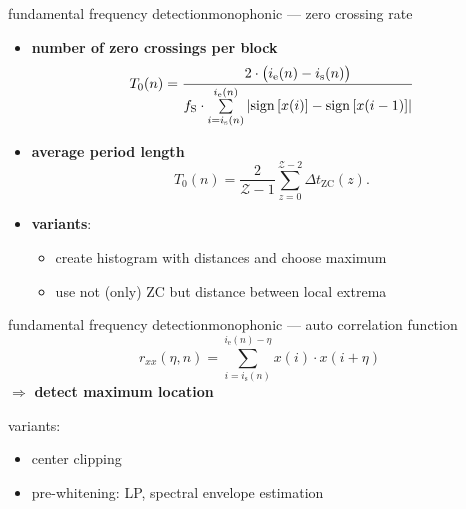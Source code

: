 	
	\begin{frame}{fundamental frequency detection}{monophonic --- zero crossing rate}
		\begin{itemize}
			\item	\textbf{number of zero crossings per block}
				\begin{equation*}
					T_0(n) = \frac{2\cdot \big(i_{\mathrm{e}}(n)-i_{\mathrm{s}}(n)\big)}{f_{\mathrm{S}}\cdot\sum\limits_{i=i_{\mathrm{s}}(n)}^{i_{\mathrm{e}}(n)}{\left|\operatorname*{sign} \left[x(i)\right]-\operatorname*{sign} \left[x(i-1)\right]\right|}} 
				\end{equation*}
			\pause
			\item	\textbf{average period length}
				\begin{equation*}
					T_0(n) = \frac{2}{\mathcal{Z}-1}\sum\limits_{z=0}^{\mathcal{Z}-2}{\Delta t_\mathrm{ZC}(z)}.
				\end{equation*}
			\pause
			\item	\textbf{variants}:
				\pause
				\begin{itemize}
					\item	create histogram with distances and choose maximum
					\pause
					\item	use not (only) ZC but distance between local extrema
				\end{itemize}
		\end{itemize}
	\end{frame}
	
	\begin{frame}{fundamental frequency detection}{monophonic --- auto correlation function}
		\vspace{-2mm}
        \begin{equation*}
			r_{xx}(\eta,n) = \sum\limits_{i=i_{\mathrm{s}}(n)}^{i_{\mathrm{e}}(n)-\eta}{x(i)\cdot x(i+\eta)}
		\end{equation*}
		\pause
		$\Rightarrow$ \textbf{detect maximum location}
		
		variants:
		\begin{itemize}
			\item<3->	center clipping
					\begin{figure}
					  	\centering
						
					  	\label{fig:centerclipping}
					\end{figure}
			\item<4->	pre-whitening: LP, spectral envelope estimation															
		\end{itemize}
	\end{frame}
	
